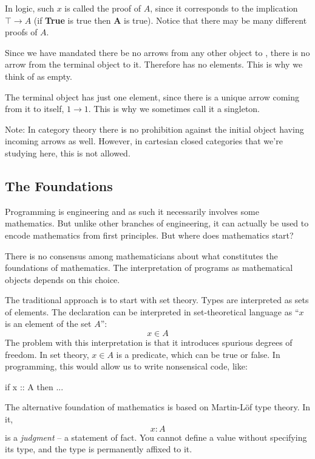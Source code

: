 \documentclass[DaoFP]{subfiles}
\begin{document}
In logic, such $ x$ is called the proof of $ A$, since it corresponds to the implication $ \top \to A$ (if \textbf{True} is true then \textbf{A} is true). Notice that there may be many different proofs of $A$.

Since we have mandated there be no arrows from any other object to , there is no arrow from the terminal object to it. Therefore  has no elements. This is why we think of  as empty.

The terminal object has just one element, since there is a unique arrow coming from it to itself, $ 1 \to 1$. This is why we sometimes call it a singleton. 

Note: In category theory there is no prohibition against the initial object having incoming arrows as well. However, in cartesian closed categories that we're studying here, this is not allowed.

\subsection{The Foundations}

Programming is engineering and as such it necessarily involves some mathematics. But unlike other branches of engineering, it can actually be used to encode mathematics from first principles. But where does mathematics start?

There is no consensus among mathematicians about what constitutes the foundations of mathematics. The interpretation of programs as mathematical objects depends on this choice.

The traditional approach is to start with set theory. Types are interpreted as sets of elements. The declaration  can be interpreted in set-theoretical language as ``$x$ is an element of the set $A$'':
\[x \in A\]
The problem with this interpretation is that it introduces spurious degrees of freedom. In set theory, $x \in A$ is a predicate, which can be true or false. In programming, this would allow us to write nonsensical code, like:
\begin{haskell} 
if x :: A then ...
\end{haskell}

The alternative foundation of mathematics is based on Martin-Löf type theory. In it, 
\[x \colon A \] 
is a \emph{judgment} -- a statement of fact. You cannot define a value without specifying its type, and the type is permanently affixed to it. 
\end{document}
